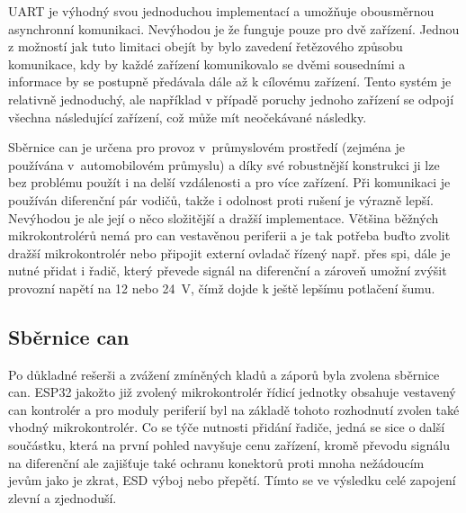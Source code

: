         UART je výhodný svou jednoduchou implementací a umožňuje obousměrnou asynchronní komunikaci. Nevýhodou je že funguje pouze pro dvě zařízení. Jednou z možností jak tuto limitaci obejít by bylo zavedení řetězového způsobu komunikace, kdy by každé zařízení komunikovalo se dvěmi sousedními a informace by se postupně předávala dále až k cílovému zařízení. Tento systém je relativně jednoduchý, ale například v případě poruchy jednoho zařízení se odpojí všechna následující zařízení, což může mít neočekávané následky.

        Sběrnice \acs{can} je určena pro provoz v~průmyslovém prostředí (zejména je používána v~automobilovém průmyslu) a díky své robustnější konstrukci ji lze bez problému použít i na delší vzdálenosti a pro více zařízení. Při komunikaci je používán diferenční pár vodičů, takže i odolnost proti rušení je výrazně lepší. Nevýhodou je ale její o něco složitější a dražší implementace. Většina běžných mikrokontrolérů nemá pro \acs{can} vestavěnou periferii a je tak potřeba buďto zvolit dražší mikrokontrolér nebo připojit externí ovladač řízený např. přes \acs{spi}, dále je nutné přidat i řadič, který převede signál na diferenční a zároveň umožní zvýšit provozní napětí na 12  nebo \qty{24}{V}, čímž dojde k ještě lepšímu potlačení šumu.

    \subsection{Sběrnice \acs{can}}
        Po důkladné rešerši a zvážení zmíněných kladů a záporů byla  zvolena sběrnice \acs{can}. ESP32 jakožto již zvolený mikrokontrolér řídicí jednotky obsahuje vestavený \acs{can} kontrolér a pro moduly periferií byl na základě tohoto rozhodnutí zvolen také vhodný mikrokontrolér. Co se týče nutnosti přidání řadiče, jedná se sice o další součástku, která na první pohled navyšuje cenu zařízení, kromě převodu signálu na diferenční ale zajišťuje také ochranu konektorů proti mnoha nežádoucím jevům jako je zkrat, ESD výboj nebo přepětí. Tímto se ve výsledku celé zapojení zlevní a zjednoduší.


   
